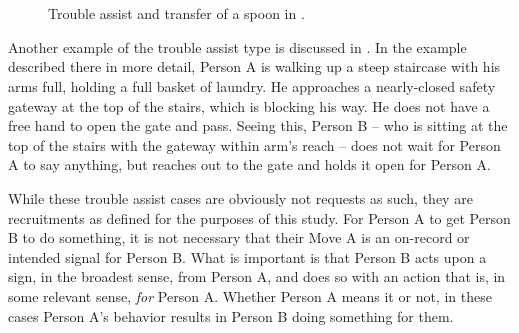 \documentclass[output=paper]{langsci/langscibook}
\begin{document}
\vspace{-1mm}
%
\begin{mdframednoverticalspace}[style=firstfoc]
\end{mdframednoverticalspace}
%
\begin{mdframednoverticalspace}[style=secondfoc]
\end{mdframednoverticalspace}\medskip

\begin{figure}
\captionsetup{width=.45\linewidth}
~~

~~

\caption{Trouble assist and transfer of a spoon in .}
\label{fig:enfield:1}
\end{figure}

Another example of the trouble assist type is discussed in \citet[42]{Enfield2014b}. In the example described there in more detail, Person A is walking up a steep staircase with his arms full, holding a full basket of laundry. He approaches a nearly-closed safety gateway at the top of the stairs, which is blocking his way. He does not have a free hand to open the gate and pass. Seeing this, Person B -- who is sitting at the top of the stairs with the gateway within arm’s reach -- does not wait for Person A to say anything, but reaches out to the gate and holds it open for Person A.

While these trouble assist cases are obviously not requests as such, they are recruitments as defined for the purposes of this study. For Person A to get Person B to do something, it is not necessary that their Move A is an on-record or intended signal for Person B. What is important is that Person B acts upon a sign, in the broadest sense, from Person A, and does so with an action that is, in some relevant sense, \textit{for} Person A. Whether Person A means it or not, in these cases Person A’s behavior results in Person B doing something for them. 
\end{document}

